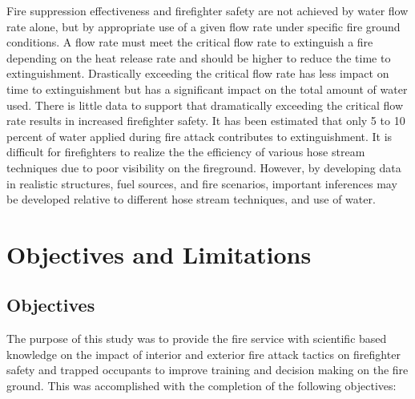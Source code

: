 \documentclass[12pt,oneside]{book}
\begin{document}
Fire suppression effectiveness and firefighter safety are not achieved by water flow rate alone, but by appropriate use of a given flow rate under specific fire ground conditions. A flow rate must meet the critical flow rate to extinguish a fire depending on the heat release rate and should be higher to reduce the time to extinguishment. Drastically exceeding the critical flow rate has less impact on time to extinguishment but has a significant impact on the total amount of water used. There is little data to support that dramatically exceeding the critical flow rate results in increased firefighter safety. It has been estimated that only 5 to 10 percent of water applied during fire attack contributes to extinguishment. It is difficult for firefighters to realize the the efficiency of various hose stream techniques due to poor visibility on the fireground. However, by developing data in realistic structures, fuel sources, and fire scenarios, important inferences may be developed relative to different hose stream techniques, and use of water.

\clearpage

\chapter{Objectives and Limitations}

\section {Objectives}

The purpose of this study was to provide the fire service with scientific based knowledge on the impact of interior and exterior fire attack tactics on firefighter safety and trapped occupants to improve training and decision making on the fire ground. This was accomplished with the completion of the following objectives:
\end{document}
